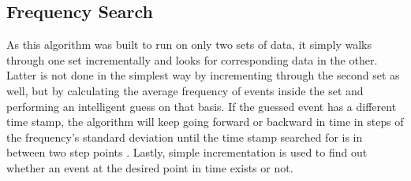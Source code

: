       \subsection{Frequency Search}
      \label{ch:Analysis software:sec:Search algorithms:subsec:Frequency Search}
      As this algorithm was built to run on only two sets of data, it simply walks through one set incrementally and looks for corresponding data in the other. Latter is not done in the simplest way by incrementing through the second set as well, but by calculating the average frequency of events inside the set and performing an intelligent guess on that basis. If the guessed event has a different time stamp, the algorithm will keep going forward or backward in time in steps of the frequency's standard deviation until the time stamp searched for is in between two step points . Lastly, simple incrementation is used to find out whether an event at the desired point in time exists or not.
